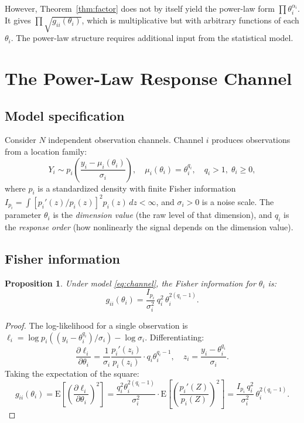 \documentclass[12pt, a4paper]{article}
\newtheorem{proposition}[theorem]{Proposition}
\theoremstyle{definition}
\theoremstyle{remark}
\begin{document}
However, Theorem~\ref{thm:factor} does not by itself yield the power-law form $\prod \theta_i^{\alpha_i}$. It gives $\prod \sqrt{g_{ii}(\theta_i)}$, which is multiplicative but with arbitrary functions of each $\theta_i$. The power-law structure requires additional input from the statistical model.

\section{The Power-Law Response Channel}\label{sec:model}

\subsection{Model specification}

Consider $N$ independent observation channels. Channel $i$ produces observations from a location family:
\begin{equation}\label{eq:channel}
Y_i \sim p_i\!\left(\frac{y_i - \mu_i(\theta_i)}{\sigma_i}\right), \quad \mu_i(\theta_i) = \theta_i^{q_i}, \quad q_i > 1, \; \theta_i \geq 0,
\end{equation}
where $p_i$ is a standardized density with finite Fisher information $I_{p_i} = \int [p_i'(z)/p_i(z)]^2 p_i(z) \, dz < \infty$, and $\sigma_i > 0$ is a noise scale. The parameter $\theta_i$ is the \textit{dimension value} (the raw level of that dimension), and $q_i$ is the \textit{response order} (how nonlinearly the signal depends on the dimension value).

\subsection{Fisher information}

\begin{proposition}\label{prop:fisher}
Under model \eqref{eq:channel}, the Fisher information for $\theta_i$ is:
\begin{equation}\label{eq:fisherpower}
g_{ii}(\theta_i) = \frac{I_{p_i}}{\sigma_i^2} \, q_i^2 \, \theta_i^{2(q_i - 1)}.
\end{equation}
\end{proposition}

\begin{proof}
The log-likelihood for a single observation is $\ell_i = \log p_i((y_i - \theta_i^{q_i})/\sigma_i) - \log \sigma_i$. Differentiating:
\[
\frac{\partial \ell_i}{\partial \theta_i} = \frac{1}{\sigma_i} \frac{p_i'(z_i)}{p_i(z_i)} \cdot q_i \theta_i^{q_i - 1}, \quad z_i = \frac{y_i - \theta_i^{q_i}}{\sigma_i}.
\]
Taking the expectation of the square:
\[
g_{ii}(\theta_i) = \mathrm{E}\!\left[\left(\frac{\partial \ell_i}{\partial \theta_i}\right)^2\right] = \frac{q_i^2 \theta_i^{2(q_i - 1)}}{\sigma_i^2} \cdot \mathrm{E}\!\left[\left(\frac{p_i'(Z)}{p_i(Z)}\right)^2\right] = \frac{I_{p_i} \, q_i^2}{\sigma_i^2} \, \theta_i^{2(q_i - 1)}.
\]
\end{proof}
\end{document}
